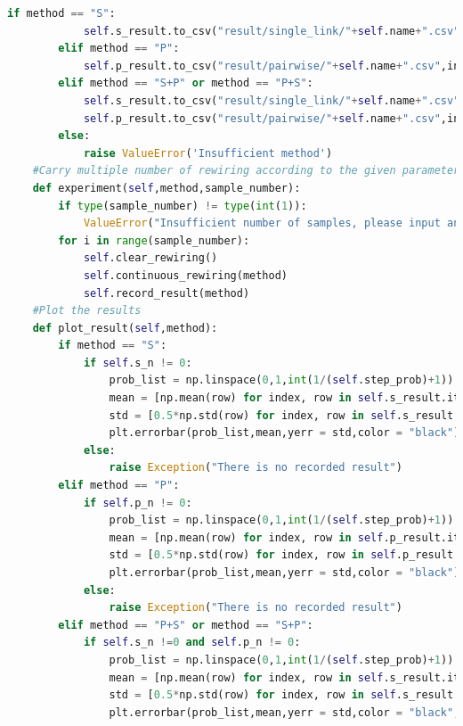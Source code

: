 \documentclass[12pt]{article}
\begin{document}
\begin{lstlisting}[breaklines=true,language=Python]
        if method == "S":
            self.s_result.to_csv("result/single_link/"+self.name+".csv",index = False)
        elif method == "P":
            self.p_result.to_csv("result/pairwise/"+self.name+".csv",index = False)
        elif method == "S+P" or method == "P+S":
            self.s_result.to_csv("result/single_link/"+self.name+".csv",index = False)
            self.p_result.to_csv("result/pairwise/"+self.name+".csv",index = False)
        else:
            raise ValueError('Insufficient method')
    #Carry multiple number of rewiring according to the given parameter
    def experiment(self,method,sample_number):
        if type(sample_number) != type(int(1)):
            ValueError("Insufficient number of samples, please input an integer.")        
        for i in range(sample_number):
            self.clear_rewiring()
            self.continuous_rewiring(method)            
            self.record_result(method)
    #Plot the results
    def plot_result(self,method):
        if method == "S":
            if self.s_n != 0:
                prob_list = np.linspace(0,1,int(1/(self.step_prob)+1))
                mean = [np.mean(row) for index, row in self.s_result.iterrows()]
                std = [0.5*np.std(row) for index, row in self.s_result.iterrows()]
                plt.errorbar(prob_list,mean,yerr = std,color = "black")
            else:
                raise Exception("There is no recorded result")
        elif method == "P":
            if self.p_n != 0:
                prob_list = np.linspace(0,1,int(1/(self.step_prob)+1))
                mean = [np.mean(row) for index, row in self.p_result.iterrows()]
                std = [0.5*np.std(row) for index, row in self.p_result.iterrows()]
                plt.errorbar(prob_list,mean,yerr = std,color = "black")
            else:
                raise Exception("There is no recorded result")
        elif method == "P+S" or method == "S+P":
            if self.s_n !=0 and self.p_n != 0:
                prob_list = np.linspace(0,1,int(1/(self.step_prob)+1))
                mean = [np.mean(row) for index, row in self.s_result.iterrows()]
                std = [0.5*np.std(row) for index, row in self.s_result.iterrows()]
                plt.errorbar(prob_list,mean,yerr = std,color = "black",label = "Single link rewiring")
                

\end{lstlisting}
\end{document}
